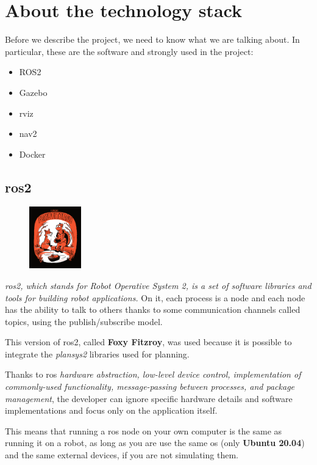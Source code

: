 \chapter{About the technology stack}
\label{cha:techstack}

Before we describe the project, we need to know what we are talking about. In particular, these are the software and strongly used in the project:  
\begin{itemize}
    \item ROS2
    \item Gazebo
    \item \acrfull{rviz}
    \item \acrfull{nav2}
    \item Docker
\end{itemize}

\section{\acrshort{ros}2}

\begin{figure}
    \includegraphics[width=0.2\textwidth]{images/foxy}
\end{figure}

\textit{\acrshort{ros}2, which stands for Robot Operative System 2, is a set of software libraries and tools for building robot applications.}\cite{ros2desc} On it, each process is a node and each node has the ability to talk to others thanks to some communication channels called topics, using the publish/subscribe model.

This version of \acrshort{ros}2, called \textbf{Foxy Fitzroy}, was used because it is possible to integrate the \textit{plansys2} libraries used for planning.

Thanks to \Acrshort{ros} \textit{hardware abstraction, low-level device control, implementation of commonly-used functionality, message-passing between processes, and package management}\cite{ros2help}, the developer can ignore specific hardware details and software implementations and focus only on the application itself. 

This means that running a \acrshort{ros} node on your own computer is the same as running it on a robot, as long as you are use the same \acrfull{os} (only \textbf{Ubuntu 20.04}) and the same external devices, if you are not simulating them.

